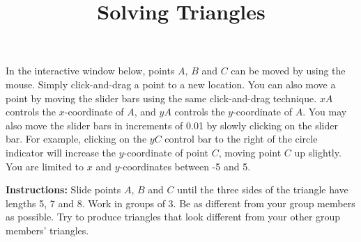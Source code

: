 \documentclass[number]{ximera}
\title{Solving Triangles}
\begin{document}
\begin{abstract}
\end{abstract}
\maketitle



In the interactive window below, points $A$, $B$ and $C$ can be moved by using the mouse. Simply click-and-drag a point to a new location. You can also move a point by moving the slider bars using the same click-and-drag technique. $xA$ controls the $x$-coordinate of $A$, and $yA$ controls the $y$-coordinate of $A$. You may also move the slider bars in increments of 0.01 by slowly clicking on the slider bar. For example, clicking on the $yC$ control bar to the right of the circle indicator will increase the $y$-coordinate of point $C$, moving point $C$ up slightly. You are limited to $x$ and $y$-coordinates between -5 and 5. 

{\bf {Instructions:}} Slide points $A$, $B$ and $C$ until the three sides of the triangle have lengths 5, 7 and 8. Work in groups of 3. Be as different from your group members as possible. Try to produce triangles that look different from your other group members' triangles.



%
%
%
\end{document}
